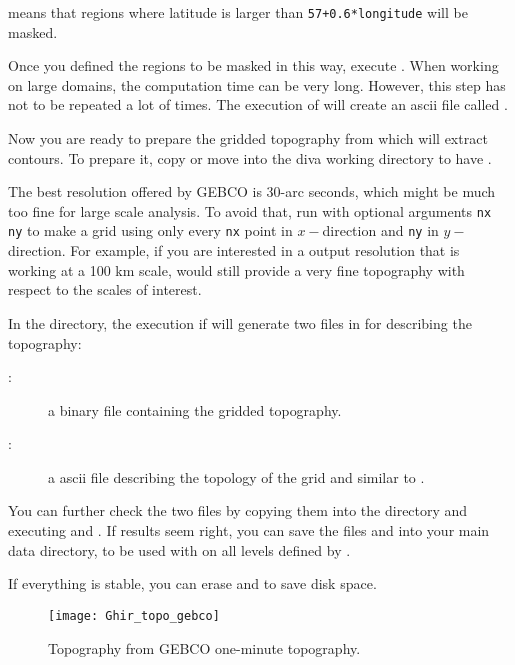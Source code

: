  means that regions where latitude is larger than \texttt{57+0.6*longitude} will be masked.

Once you defined the regions to be masked in this way, execute . When working on large domains, the computation time can be very long. However, this step has not to be repeated a lot of times. The execution of  will create an ascii file called 
.

Now you are ready to prepare the gridded topography  from which \diva will extract contours. To prepare it,
copy or move  into the diva working directory to have .

The best resolution offered by GEBCO is 30-arc seconds, which might be much too fine for large scale analysis. To avoid that, run
 with optional arguments {\tt nx ny} to make a grid using only every {\tt nx} point in $x-$direction and {\tt ny} in $y-$direction. For example, if you are interested in a \diva output resolution that is working at a 100 km scale,  would still provide a very fine topography with respect to the scales of interest.

In the  directory, the execution if  will generate two files in  for describing the topography:
\begin{description}
\item[:] a binary file containing the gridded topography.
\item[:] a ascii file describing the topology of the grid and similar to .
\end{description}





You can further check the two files by copying them into the  directory and executing  and . If results seem right, you can save the files  and  into your main data directory, to be used with  on all levels defined by .

If everything is stable, you can erase  and  to save disk space. 

\begin{figure}[htpb]
\centering
\texttt{[image: Ghir\_topo\_gebco]}
\caption{Topography from GEBCO one-minute topography.\label{fig:topoGebco3}}
\end{figure}


